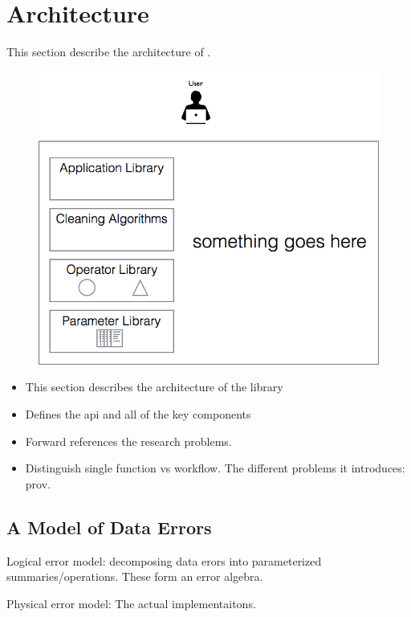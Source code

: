 \section{Architecture}

This section describe the architecture of \sys.

\begin{figure}[ht]
  \centering
  \includegraphics[width=.95\columnwidth]{figs/arch}
  \caption{}
  \label{f:arch}
\end{figure}


\begin{itemize}
    \item This section describes the architecture of the library
    \item Defines the api and all of the key components
    \item Forward references the research problems.
    \item Distinguish single function vs workflow.  The different problems it introduces: prov.
\end{itemize}


\subsection{A Model of Data Errors}


Logical error model: decomposing data erors into parameterized summaries/operations.  These form an error algebra.

Physical error model: The actual implementaitons.